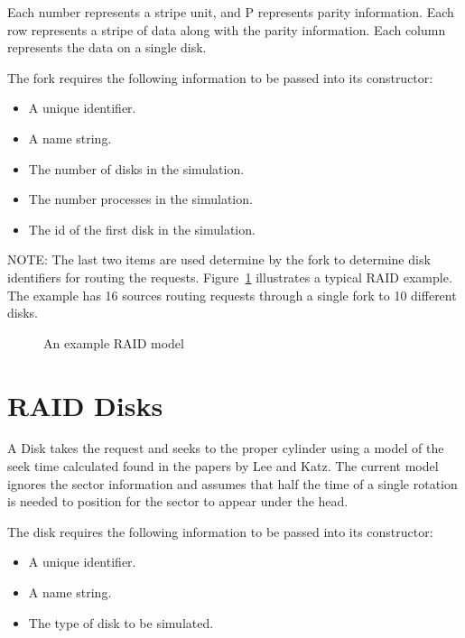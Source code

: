 \documentclass[11pt]{report}
\begin{document}
Each number represents a stripe unit, and P represents parity
information.  Each row represents a stripe of data along with the parity
information.  Each column represents the data on a single disk.

The fork requires the following information to be passed into its
constructor:
\begin{itemize}

\item
A unique identifier.

\item
A name string. 

\item
The number of disks in the simulation.

\item
The number processes in the simulation.

\item
The id of the first disk in the simulation.

\end{itemize}

NOTE: The last two items are used determine by the fork to determine
disk identifiers for routing the requests. Figure~\ref{fig:raid_fig}
illustrates a typical RAID example. The example has 16 sources routing
requests through a single fork to 10 different disks.

\begin{figure}
\centerline{}
\caption{An example RAID model}\label{fig:raid_fig}
\end{figure}

\chapter{RAID Disks}

A Disk takes the request and seeks to the proper cylinder using a model
of the seek time calculated found in the papers by Lee and Katz.  The
current model ignores the sector information and assumes that half the
time of a single rotation is needed to position for the sector to appear
under the head.

The disk requires the following information to be passed into its
constructor:

\begin{itemize}

\item
A unique identifier.

\item
A name string. 

\item
The type of disk to be simulated.

\end{itemize}
\end{document}
